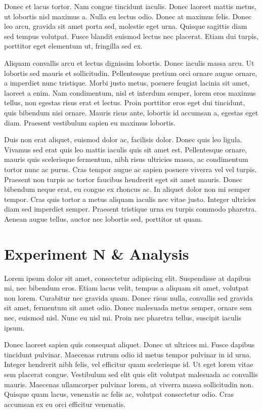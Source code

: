 Donec et lacus tortor. Nam congue tincidunt iaculis. Donec laoreet mattis metus, ut lobortis nisl maximus a. Nulla eu lectus odio. Donec at maximus felis. Donec leo arcu, gravida sit amet porta sed, molestie eget urna. Quisque sagittis diam sed tempus volutpat. Fusce blandit euismod lectus nec placerat. Etiam dui turpis, porttitor eget elementum ut, fringilla sed ex.

Aliquam convallis arcu et lectus dignissim lobortis. Donec iaculis massa arcu. Ut lobortis sed mauris et sollicitudin. Pellentesque pretium orci ornare augue ornare, a imperdiet nunc tristique. Morbi justo metus, posuere feugiat lacinia sit amet, laoreet a enim. Nam condimentum, nisl et interdum semper, lorem eros maximus tellus, non egestas risus erat et lectus. Proin porttitor eros eget dui tincidunt, quis bibendum nisi ornare. Mauris risus ante, lobortis id accumsan a, egestas eget diam. Praesent vestibulum sapien eu maximus lobortis.

Duis non erat aliquet, euismod dolor ac, facilisis dolor. Donec quis leo ligula. Vivamus sed erat quis leo mattis iaculis quis sit amet est. Pellentesque ornare, mauris quis scelerisque fermentum, nibh risus ultricies massa, ac condimentum tortor nunc ac purus. Cras tempor augue ac sapien posuere viverra vel vel turpis. Praesent non turpis ac tortor faucibus hendrerit eget sit amet mauris. Donec bibendum neque erat, eu congue ex rhoncus ac. In aliquet dolor non mi semper tempor. Cras quis tortor a metus aliquam iaculis nec vitae justo. Integer ultricies diam sed imperdiet semper. Praesent tristique urna eu turpis commodo pharetra. Aenean augue tellus, auctor nec lobortis sed, porttitor ut quam.

\section{Experiment N \& Analysis}
Lorem ipsum dolor sit amet, consectetur adipiscing elit. Suspendisse at dapibus mi, nec bibendum eros. Etiam lacus velit, tempus a aliquam sit amet, volutpat non lorem. Curabitur nec gravida quam. Donec risus nulla, convallis sed gravida sit amet, fermentum sit amet odio. Donec malesuada metus semper, ornare sem nec, euismod nisl. Nunc eu nisl mi. Proin nec pharetra tellus, suscipit iaculis ipsum.

Donec laoreet sapien quis consequat aliquet. Donec ut ultrices mi. Fusce dapibus tincidunt pulvinar. Maecenas rutrum odio id metus tempor pulvinar in id urna. Integer hendrerit nibh felis, vel efficitur quam scelerisque id. Ut eget lorem vitae sem placerat congue. Vestibulum sed elit quis elit volutpat malesuada ac convallis mauris. Maecenas ullamcorper pulvinar lorem, at viverra massa sollicitudin non. Quisque quam lacus, venenatis ac felis ac, volutpat consectetur odio. Cras accumsan ex eu orci efficitur venenatis.

